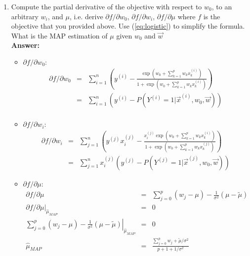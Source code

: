 \documentclass{article}
\begin{document}
\begin{enumerate}
	\item Compute the partial derivative of the objective with respect to $w_0$, to an arbitrary $w_i$, and $\mu$, i.e. derive $\partial f/\partial w_0$, $\partial f/\partial w_i$, $\partial f/\partial \mu$ where $f$ is the objective that you provided above. Use (\ref{eq:logistic}) to simplify the formula. What is the MAP estimation of $\mu$ given $w_0$ and $\vec{w}$
	\\\textbf{Answer:}\\
	\begin{itemize}
		\item $\partial f/\partial w_0$:
		\begin{equation}
		\nonumber
		\begin{array}{rcl}
		\partial f/\partial w_0 & = & \sum_{i=1}^{n}(y^{(i)}-\frac{\exp(w_0+\sum_{k=1}^{p}w_kx_k^{(i)})}{1+\exp(w_0+\sum_{k=1}^{p}w_kx_k^{(i)})}) \\
								& = & \sum_{i=1}^{n}(y^{(i)}-P(Y^{(i)}=1|\vec{x}^{(i)},w_0,\vec{w})) \\
		\end{array}
		\end{equation}
		\item $\partial f/\partial w_i$:
		\begin{equation}
		\nonumber
		\begin{array}{rcl}
		\partial f/\partial w_i & = & \sum_{j=1}^{n}(y^{(j)}x_i^{(j)}-\frac{x_i^{(j)}\exp(w_0+\sum_{k=1}^{p}w_kx_k^{(i)})}{1+\exp(w_0+\sum_{k=1}^{p}w_kx_k^{(j)})}) \\
		& = & \sum_{j=1}^{n}x_i^{(j)}(y^{(j)}-P(Y^{(j)}=1|\vec{x}^{(j)},w_0,\vec{w}))
		\end{array}
		\end{equation}
		\item $\partial f/\partial \mu$:
		\begin{equation}
		\nonumber
		\begin{array}{rcl}
		\partial f/\partial \mu & = & \sum_{j=0}^{p}(w_j-\mu) - \frac{1}{\sigma^2}(\mu-\tilde{\mu}) \\
		\left. \partial f/\partial \mu \right|_{\hat{\mu}_{MAP}} & = & 0 \\
		\left. \sum_{j=0}^{p}(w_j-\mu) - \frac{1}{\sigma^2}(\mu-\tilde{\mu}) \right|_{\hat{\mu}_{MAP}} & = & 0 \\
		\hat{\mu}_{MAP} & = & \frac{\sum_{j=0}^{p}w_j + \tilde{\mu}/\sigma^2}{p+1+1/\sigma^2}
		\end{array}
		\end{equation}
	\end{itemize}
\end{enumerate}
\end{document}
